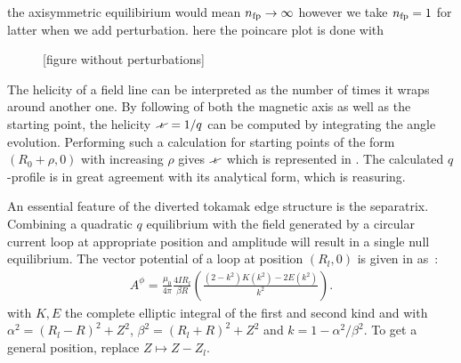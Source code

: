 the axisymmetric equilibirium would mean $n_\text{fp} \to \infty$ however we take $n_\text{fp} = 1$ for latter when we add perturbation. here the poincare plot is done with 


\begin{figure}[h!]
    \hfill
    \caption{[figure without perturbations]}
\end{figure}

The helicity of a field line can be interpreted as the number of times it wraps around another one. By following of both the magnetic axis as well as the starting point, the helicity $\iotaslash = 1/q$ can be computed by integrating the angle evolution. Performing such a calculation for starting points of the form $(R_0+\rho,0)$ with increasing $\rho$ gives $\iotaslash$ which is represented in . The calculated $q$-profile is in great agreement with its analytical form, which is reasuring.

An essential feature of the diverted tokamak edge structure is the separatrix. Combining a quadratic $q$ equilibrium with the field generated by a circular current loop at appropriate position and amplitude will result in a single null equilibrium. The vector potential of a loop at position $(R_l, 0)$ is given in \cite{simpson_simple_2001} as~:
\begin{align*}
    A^\phi = \frac{\mu_0}{4\pi}\frac{4IR_l}{\beta R}\left(\frac{(2-k^2)K(k^2)-2E(k^2)}{k^2}\right).
\end{align*}
with $K, E$ the complete elliptic integral of the first and second kind and with $\alpha^2 = (R_l-R)^2 + Z^2$, $\beta^2 = (R_l+R)^2+Z^2$ and $k = 1 - \alpha^2/\beta^2$. To get a general position, replace $Z \mapsto Z-Z_l$.

